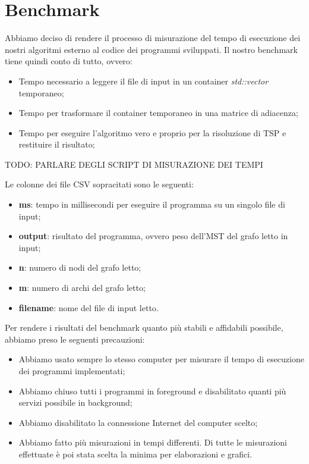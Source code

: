 \section{Benchmark}
\label{cap:benchmark-process}

Abbiamo deciso di rendere il processo di misurazione del tempo di esecuzione dei nostri algoritmi esterno al codice dei programmi sviluppati.
Il nostro benchmark tiene quindi conto di tutto, ovvero:

\begin{itemize}
    \item Tempo necessario a leggere il file di input in un container \textit{std::vector} temporaneo;
    \item Tempo per trasformare il container temporaneo in una matrice di adiacenza;
    \item Tempo per eseguire l'algoritmo vero e proprio per la risoluzione di TSP e restituire il risultato;
\end{itemize}

\noindent TODO: PARLARE DEGLI SCRIPT DI MISURAZIONE DEI TEMPI

\noindent Le colonne dei file CSV sopracitati sono le seguenti:

\begin{itemize}
    \item \textbf{ms}: tempo in millisecondi per eseguire il programma su un singolo file di input;
    \item \textbf{output}: risultato del programma, ovvero peso dell'MST del grafo letto in input;
    \item \textbf{n}: numero di nodi del grafo letto;
    \item \textbf{m}: numero di archi del grafo letto;
    \item \textbf{filename}: nome del file di input letto.
\end{itemize}

\noindent Per rendere i risultati del benchmark quanto più stabili e affidabili possibile, abbiamo preso le seguenti precauzioni:

\begin{itemize}
    \item Abbiamo usato sempre lo stesso computer per misurare il tempo di esecuzione dei programmi implementati;
    \item Abbiamo chiuso tutti i programmi in foreground e disabilitato quanti più servizi possibile in background;
    \item Abbiamo disabilitato la connessione Internet del computer scelto;
    \item Abbiamo fatto più misurazioni in tempi differenti. Di tutte le misurazioni effettuate è poi stata scelta la minima per elaborazioni e grafici.
\end{itemize}

